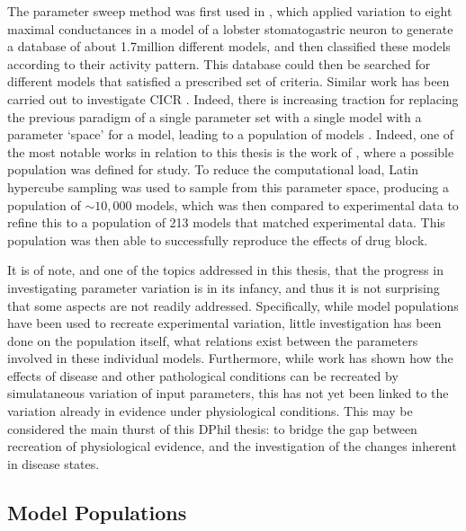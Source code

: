 \documentclass[../thesis-main.tex]{subfiles}
\begin{document}
The parameter sweep method was first used in \citet{Prinz2003}, which applied variation to eight maximal conductances in a model of a lobster stomatogastric neuron to generate a database of about 1.7million different models, and then classified these models according to their activity pattern. This database could then be searched for different models that satisfied a prescribed set of criteria. Similar work has been carried out to investigate CICR \citep{Sobie2009a}. Indeed, there is increasing traction for replacing the previous paradigm of a single parameter set with a single model with a parameter `space' for a model, leading to a population of models \citep{Davies2012, Taylor2009, Prinz2003, Marder2011}. Indeed, one of the most notable works in relation to this thesis is the work of \citep{Britton2013}, where a possible population was defined for study. To reduce the computational load, Latin hypercube sampling was used to sample from this parameter space, producing a population of $\sim10,000$ models, which was then compared to experimental data to refine this to a population of 213 models that matched experimental data. This population was then able to successfully reproduce the effects of \ikr{} drug block.

It is of note, and one of the topics addressed in this thesis, that the progress in investigating parameter variation is in its infancy, and thus it is not surprising that some aspects are not readily addressed. Specifically, while model populations have been used to recreate experimental variation, little investigation has been done on the population itself, \idest{} what relations exist between the parameters involved in these individual models. Furthermore, while work has shown how the effects of disease and other pathological conditions can be recreated by simulataneous variation of input parameters, this has not yet been linked to the variation already in evidence under physiological conditions. This may be considered the main thurst of this DPhil thesis: to bridge the gap between recreation of physiological evidence, and the investigation of the changes inherent in disease states.

\subsection{Model Populations}

\end{document}
